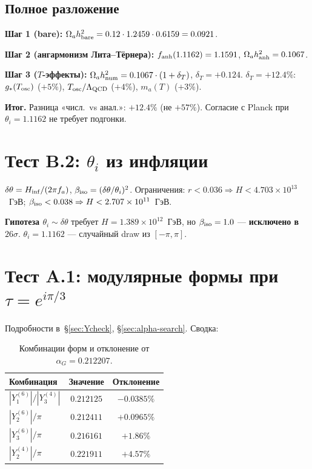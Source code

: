\documentclass[12pt,a4paper]{article}
\numberwithin{equation}{section}
\begin{document}
\subsection{Полное разложение}
\label{sec:omega-breakdown}

\textbf{Шаг 1 (bare):}
$\Omega_a h^2_{\rm bare} = 0.12 \cdot 1.2459 \cdot 0.6159 = 0.0921$.

\textbf{Шаг 2 (ангармонизм Лита--Тёрнера):}
$f_{\rm anh}(1.1162) = 1.1591$, $\Omega_a h^2_{\rm anh} = 0.1067$.

\textbf{Шаг 3 ($T$-эффекты):}
$\Omega_a h^2_{\rm num} = 0.1067 \cdot (1 + \delta_T)$, $\delta_T = +0.124$.
$\delta_T = +12.4\%$: $g_*(T_{\rm osc})$ ($+5\%$),
$T_{\rm osc}/\Lambda_{\rm QCD}$ ($+4\%$), $m_a(T)$ ($+3\%$).

\textbf{Итог.} Разница «числ.\ vs анал.»: $+12.4\%$ (не $+57\%$).
Согласие с Planck при $\theta_i = 1.1162$ не требует подгонки.

\section{Тест B.2: $\theta_i$ из инфляции}

$\delta\theta = H_{\rm inf}/(2\pi f_a)$, $\beta_{\rm iso} = (\delta\theta/\theta_i)^2$.
Ограничения: $r < 0.036 \Rightarrow H < 4.703\times10^{13}$~ГэВ;
$\beta_{\rm iso} < 0.038 \Rightarrow H < 2.707\times10^{11}$~ГэВ.

\textbf{Гипотеза $\theta_i \sim \delta\theta$} требует $H = 1.389\times10^{12}$~ГэВ,
но $\beta_{\rm iso} = 1.0$ --- \textbf{исключено в $26\sigma$}.
$\theta_i = 1.1162$ --- случайный draw из $[-\pi,\pi]$.

\section{Тест A.1: модулярные формы при $\tau = e^{i\pi/3}$}

Подробности в~\S\ref{sec:Ycheck}, \S\ref{sec:alpha-search}. Сводка:

\begin{table}[H]
\centering
\caption{Комбинации форм и отклонение от $\alpha_G = 0.212207$.}
\begin{tabular}{lcc}
\toprule
Комбинация & Значение & Отклонение \\
\midrule
$|Y^{(6)}_1|/|Y^{(4)}_3|$ & $0.212125$ & $-0.0385\%$ \\
$|Y^{(6)}_2|/\pi$ & $0.212411$ & $+0.0965\%$ \\
$|Y^{(6)}_3|/\pi$ & $0.216161$ & $+1.86\%$ \\
$|Y^{(4)}_2|/\pi$ & $0.221911$ & $+4.57\%$ \\
\bottomrule
\end{tabular}
\end{table}
\end{document}
